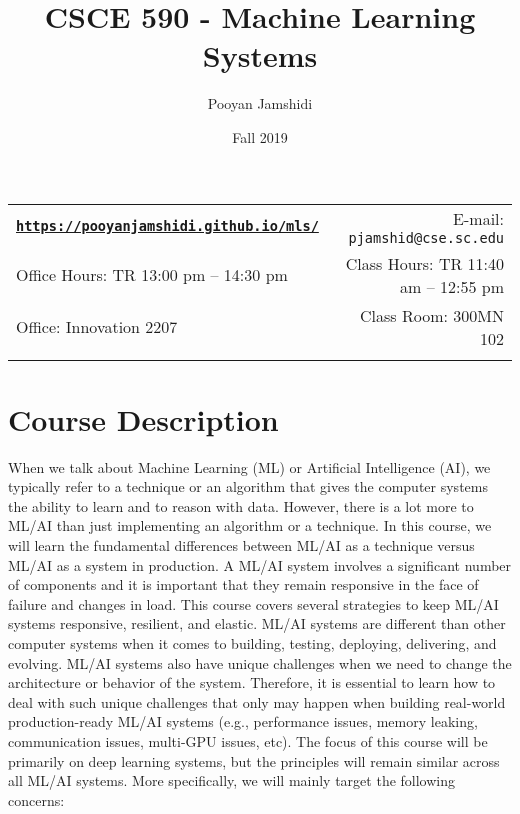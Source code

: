 \documentclass[11pt]{article}
\title{CSCE 590 - Machine Learning Systems}
\author{Pooyan Jamshidi}
\date{Fall 2019}
\newcommand{\blankline}{\quad\pagebreak[2]}
\begin{document}
\maketitle

\blankline

\begin{tabular*}{.93\textwidth}{@{\extracolsep{\fill}}lr}


\href{https://pooyanjamshidi.github.io/mls/}{\tt\bf https://pooyanjamshidi.github.io/mls/}  & E-mail: \texttt{pjamshid@cse.sc.edu} \\

Office Hours: TR 13:00 pm -- 14:30 pm  &  Class Hours: TR 11:40 am -- 12:55 pm \\

Office: Innovation 2207 & Class Room: 300MN 102 \\
&  \\

\hline
\end{tabular*}

\vspace{10mm}

\section*{Course Description}

When we talk about Machine Learning (ML) or Artificial Intelligence (AI), we typically refer to a technique or an algorithm that gives the computer systems the ability to learn and to reason with data. However, there is a lot more to ML/AI than just implementing an algorithm or a technique. In this course, we will learn the fundamental differences between ML/AI as a technique versus ML/AI as a system in production. A ML/AI system involves a significant number of components and it is important that they remain responsive in the face of failure and changes in load. This course covers several strategies to keep ML/AI systems responsive, resilient, and elastic. ML/AI systems are different than other computer systems when it comes to building, testing, deploying, delivering, and evolving. ML/AI systems also have unique challenges when we need to change the architecture or behavior of the system. Therefore, it is essential to learn how to deal with such unique challenges that only may happen when building real-world production-ready ML/AI systems (e.g., performance issues, memory leaking, communication issues, multi-GPU issues, etc). The focus of this course will be primarily on deep learning systems, but the principles will remain similar across all ML/AI systems. More specifically, we will mainly target the following concerns:
\end{document}
